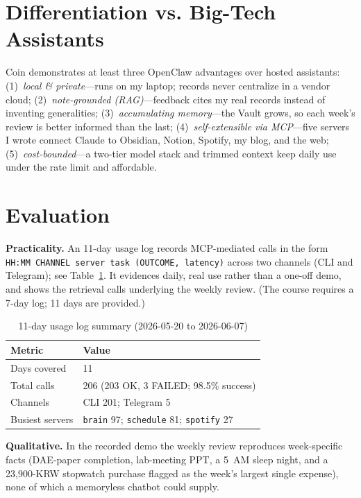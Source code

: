 \documentclass[conference]{IEEEtran}
\begin{document}
\section{Differentiation vs. Big-Tech Assistants}
Coin demonstrates at least three OpenClaw advantages over hosted assistants:
(1)~\emph{local \& private}---runs on my laptop; records never centralize in a
vendor cloud; (2)~\emph{note-grounded (RAG)}---feedback cites my real records
instead of inventing generalities; (3)~\emph{accumulating memory}---the Vault
grows, so each week's review is better informed than the last;
(4)~\emph{self-extensible via MCP}---five servers I wrote connect Claude to
Obsidian, Notion, Spotify, my blog, and the web; (5)~\emph{cost-bounded}---a
two-tier model stack and trimmed context keep daily use under the rate limit and
affordable.

\section{Evaluation}
\textbf{Practicality.} An 11-day usage log records MCP-mediated calls in the form
\texttt{HH:MM CHANNEL server task (OUTCOME, latency)} across two channels (CLI and
Telegram); see Table~\ref{tab:usage}. It evidences daily, real use rather than a
one-off demo, and shows the retrieval calls underlying the weekly review. (The
course requires a 7-day log; 11 days are provided.)

\begin{table}[t]
\caption{11-day usage log summary (2026-05-20 to 2026-06-07)}
\label{tab:usage}
\centering
\footnotesize
\begin{tabular}{@{}ll@{}}
\toprule
\textbf{Metric} & \textbf{Value} \\
\midrule
Days covered     & 11 \\
Total calls      & 206 (203 OK, 3 FAILED; 98.5\% success) \\
Channels         & CLI 201; Telegram 5 \\
Busiest servers  & \texttt{brain} 97; \texttt{schedule} 81; \texttt{spotify} 27 \\
\bottomrule
\end{tabular}
\end{table}

\textbf{Qualitative.} In the recorded demo the weekly review reproduces
week-specific facts (DAE-paper completion, lab-meeting PPT, a 5~AM sleep night, and
a 23{,}900-KRW stopwatch purchase flagged as the week's largest single expense),
none of which a memoryless chatbot could supply.
\end{document}
